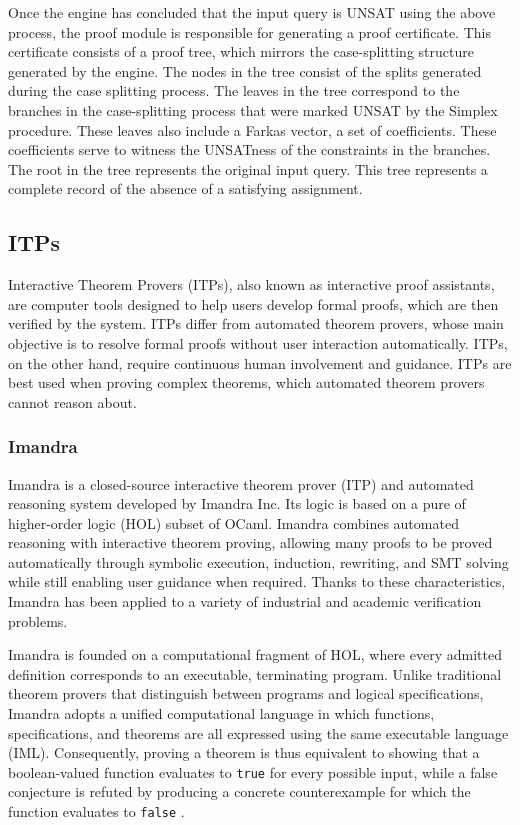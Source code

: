 Once the engine has concluded that the input query is UNSAT using the above process, the proof module is responsible for generating a proof certificate. This certificate consists of a proof tree, which mirrors the case-splitting structure generated by the engine. The nodes in the tree consist of the splits generated during the case splitting process. The leaves in the tree correspond to the branches in the case-splitting process that were marked UNSAT by the Simplex procedure. These leaves also include a Farkas vector, a set of coefficients. These coefficients serve to witness the UNSATness of the constraints in the branches. The root in the tree represents the original input query. This tree represents a complete record of the absence of a satisfying assignment.

\subsection{ITPs}

Interactive Theorem Provers (ITPs), also known as interactive proof assistants, are computer tools designed to help users develop formal proofs, which are then verified by the system. ITPs differ from automated theorem provers, whose main objective is to resolve formal proofs without user interaction automatically. ITPs, on the other hand, require continuous human involvement and guidance. ITPs are best used when proving complex theorems, which automated theorem provers cannot reason about.


\subsubsection{Imandra}

Imandra is a closed-source interactive theorem prover (ITP) and automated reasoning system developed by Imandra Inc. Its logic is based on a pure of higher-order logic (HOL) subset of OCaml. Imandra combines automated reasoning with interactive theorem proving, allowing many proofs to be proved automatically through symbolic execution, induction, rewriting, and SMT solving while still enabling user guidance when required. Thanks to these characteristics, Imandra has been applied to a variety of industrial and academic verification problems. 

Imandra is founded on a computational fragment of HOL, where every admitted definition corresponds to an executable, terminating program. Unlike traditional theorem provers that distinguish between programs and logical specifications, Imandra adopts a unified computational language in which functions, specifications, and theorems are all expressed using the same executable language (IML). Consequently, proving a theorem is thus equivalent to showing that a boolean-valued function evaluates to \texttt{true} for every possible input, while a false conjecture is refuted by producing a concrete counterexample for which the function evaluates to \texttt{false} \cite{imandra_automated_reasoning_system}.

